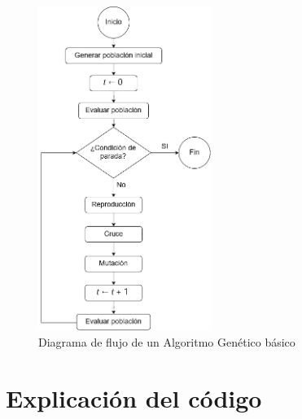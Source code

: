 \documentclass[12pt]{article}
\theoremstyle{bfTheoremWithNote}
\theoremstyle{bfRemark}
\begin{document}
    \begin{figure}[h]
        \centering
        \label{fig:flowchart-gen-algorithm}
        \includegraphics[width = 0.5\textwidth]{Images/flowchart-gen-algorithm.png}
        \caption{Diagrama de flujo de un Algoritmo Genético básico}
    \end{figure}

    \section{Explicación del código}
\end{document}
